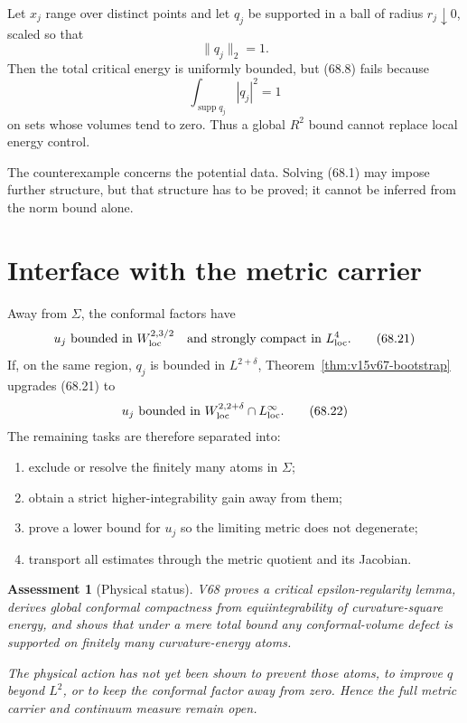 \documentclass[11pt]{article}
\newtheorem{assessment}[theorem]{Assessment}
\theoremstyle{remark}
\begin{document}
\begin{counterexample}
\label{cnt:v15v68-moving-energy}
Let \(x_j\) range over distinct points and let \(q_j\) be supported
in a ball of radius \(r_j\downarrow0\), scaled so that
\[
 \|q_j\|_2=1.                                         \tag{68.20}
\]
Then the total critical energy is uniformly bounded, but (68.8)
fails because
\[
 \int_{\operatorname{supp}q_j}|q_j|^2=1
\]
on sets whose volumes tend to zero.  Thus a global \(R^2\) bound
cannot replace local energy control.
\end{counterexample}

The counterexample concerns the potential data.  Solving (68.1)
may impose further structure, but that structure has to be proved;
it cannot be inferred from the norm bound alone.

\section{Interface with the metric carrier}

Away from \(\Sigma\), the conformal factors have
\[
 u_j\ \hbox{bounded in }W^{2,3/2}_{\rm loc}
 \quad\hbox{and strongly compact in }L^4_{\rm loc}.    \tag{68.21}
\]
If, on the same region, \(q_j\) is bounded in
\(L^{2+\delta}\), Theorem~\ref{thm:v15v67-bootstrap}
upgrades (68.21) to
\[
 u_j\ \hbox{bounded in }W^{2,2+\delta}_{\rm loc}
 \cap L^\infty_{\rm loc}.                             \tag{68.22}
\]
The remaining tasks are therefore separated into:
\begin{enumerate}
\item exclude or resolve the finitely many atoms in \(\Sigma\);
\item obtain a strict higher-integrability gain away from them;
\item prove a lower bound for \(u_j\) so the limiting metric does
      not degenerate;
\item transport all estimates through the metric quotient and its
      Jacobian.
\end{enumerate}

\begin{assessment}[Physical status]
\label{ass:v15v68-status}
V68 proves a critical epsilon-regularity lemma, derives global
conformal compactness from equiintegrability of curvature-square
energy, and shows that under a mere total bound any conformal-volume
defect is supported on finitely many curvature-energy atoms.

The physical action has not yet been shown to prevent those atoms,
to improve \(q\) beyond \(L^2\), or to keep the conformal factor
away from zero.  Hence the full metric carrier and continuum
measure remain open.
\end{assessment}
\end{document}
